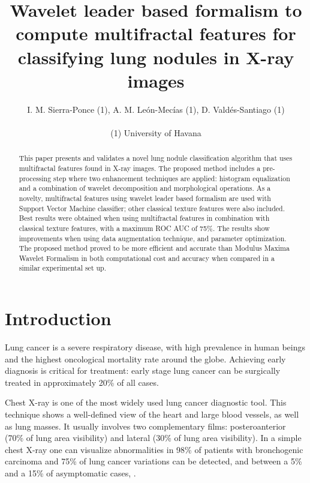 \documentclass{article}
\title{Wavelet leader based formalism to compute multifractal features for classifying lung nodules in X-ray images}
\author{I. M. Sierra-Ponce (1), A. M. León-Mecías (1), D. Valdés-Santiago (1)\\\\ (1) University of Havana
}
\begin{document}
\maketitle

\begin{abstract}
This paper presents and validates a novel lung nodule classification algorithm that uses multifractal features found in X-ray images. The proposed method includes a pre-processing step where two enhancement techniques are applied: histogram equalization and a combination of wavelet decomposition and morphological operations. As a novelty, multifractal features using wavelet leader based formalism are used with Support Vector Machine classifier; other classical texture features were also included. Best results were obtained when using multifractal features in combination with classical texture features, with a maximum ROC AUC of 75\%. The results show improvements when using data augmentation technique, and parameter optimization. The proposed method proved to be more efficient and accurate than Modulus Maxima Wavelet Formalism in both computational cost and accuracy when compared in a similar experimental set up. 
\end{abstract}





\section{Introduction}
	Lung cancer is a severe respiratory disease, with high prevalence in human beings and the highest oncological mortality rate around the globe. Achieving early diagnosis is critical for treatment: early stage lung cancer can be surgically treated in approximately 20\% of all cases. 

Chest X-ray is one of the most widely used lung cancer diagnostic tool. This technique shows a well-defined view of the heart and large blood vessels, as well as lung masses. It usually involves two complementary films: posteroanterior (70\% of lung area visibility) and lateral (30\% of lung area visibility). In a simple chest X-ray one can visualize abnormalities in 98\% of patients with bronchogenic carcinoma and 75\% of lung cancer variations can be detected, and between a 5\% and a 15\% of asymptomatic cases, \citep{kelly2012chest}.
\end{document}

